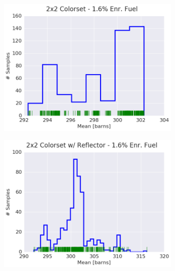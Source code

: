 \begin{figure}[h!]
\begin{subfigure}{0.5\textwidth}
  \centering
  \includegraphics[width=\linewidth]{figures/patterns/2x2/hist-kde-rug/16-enr-fiss-2}
  \caption{}
  \label{fig:chap9-hist-2x2-1.6-fiss}
\end{subfigure}%
\begin{subfigure}{0.5\textwidth}
  \centering
  \includegraphics[width=\linewidth]{figures/patterns/reflector/hist-kde-rug/16-enr-fiss-2}  \caption{}
  \label{fig:chap9-hist-reflector-1.6-fiss}
\end{subfigure}
\begin{subfigure}{0.5\textwidth}
  \centering

\end{subfigure}
\end{figure}
